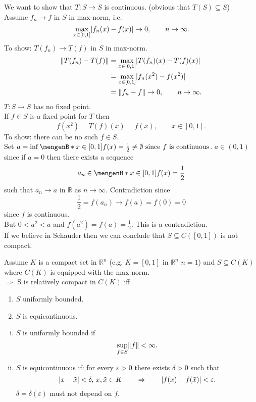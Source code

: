 \begin{beispiel}
	We want to show that $T: S \to S$ is continuous. (obvious that $T(S) \subseteq S$)\\ Assume $f_n \to f$ in $S$ in max-norm, i.e.
	\[
		\max_{x \in [0,1]} \lvert f_n(x)-f(x)\rvert \to 0, \qquad n \to \infty.
	\]
	To show: $T(f_n) \to T(f)$ in $S$ in max-norm.
	\begin{align*}
		\norm{T(f_n)-T(f)} &= \max_{x \in [0,1]}\abs{T(f_n)(x)- T(f)(x)} \\ & = \max_{x \in [0,1]}\abs{f_n(x^2)-f(x^2)}  \\ &= \norm{f_n -f} \to 0, \qquad n \to \infty.
	\end{align*}
	$T: S \to S $ has no fixed point. \\
	If $f \in S$ is a fixed point for $T$ then 
	\[
		f(x^2) = T(f)(x) = f(x), \qquad x \in [0,1].
	\]
	To show: there can be no such $f \in S$. \\
	Set $a = \inf \set[x \in [0,1]]{f(x) = \frac{1}{2}} \neq \emptyset \text{ since $f$ is continuous}$. $a \in (0,1)$ since if $a = 0$ then there exists a sequence
	\[
		a_n \in \set[x \in [0,1]]{f(x)= \frac{1}{2}} 
	\]
	such that $a_n \to a$ in $\mathbb{R}$ as $n \to \infty$. Contradiction since 
	\[
		\frac{1}{2} = f(a_n) \to f(a) = f(0) = 0
	\]
	since $f$ is continuous. \\
	But $0 < a^2 < a$ and $f(a^2) = f(a) = \frac{1}{2}$. This is a contradiction. \\
	If we believe in Schauder then we can conclude that $S \subseteq C([0,1])$ is not compact.
\end{beispiel}
\begin{theorem}
	Assume $K$ is a compact set in $\mathbb{R}^n$ (e.g. $K = [0,1]$ in $\mathbb{R}^n$ $n=1$) and $S \subseteq C(K)$ where $C(K)$ is equipped with the max-norm. \\
	$\Rightarrow $ S is relatively compact in $C(K)$ iff
	\begin{enumerate}[(1)]
		\item $S$ uniformly bounded.
		\item $S$ is equicontinuous.
	\end{enumerate}
\end{theorem}
\begin{definition*}
	\begin{enumerate}[(i)]
		\item $S$ is uniformly bounded if
		\[
			\sup\limits_{f \in S} \norm{f} < \infty.
		\]
		\item $S$ is equicontinuous if: for every $\varepsilon >0$ there exists $\delta >0$ such that
		\[
			\lvert x- \tilde x\rvert < \delta, \, x, \tilde x \in K \qquad \Rightarrow \qquad \lvert f(x)-f(\tilde x)\rvert< \varepsilon.
		\]
		$\delta = \delta (\varepsilon)$ must not depend on $f$. \\
	\end{enumerate}
\end{definition*}
